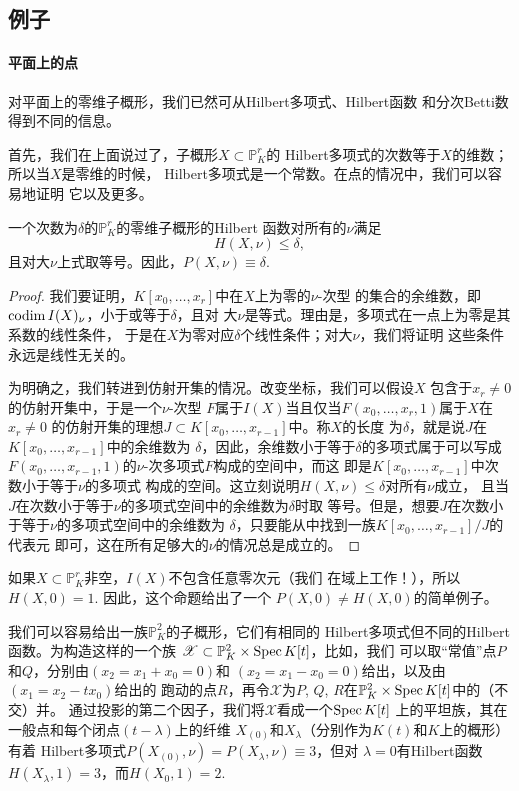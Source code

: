 \subsection{例子}\label{s:3.3.4}
\paragraph*{平面上的点}
对平面上的零维子概形，我们已然可从Hilbert多项式、Hilbert函数
和分次Betti数得到不同的信息。

首先，我们在上面说过了，子概形$X\subset \mathbb P_K^r$的
Hilbert多项式的次数等于$X$的维数；所以当$X$是零维的时候，
Hilbert多项式是一个常数。在点的情况中，我们可以容易地证明
它以及更多。

\begin{pro}\label{pro:3.59}
  一个次数为$\delta$的$\mathbb P_K^r$的零维子概形的Hilbert
  函数对所有的$\nu$满足
  \[H(X,\nu)\leq \delta,\]
  且对大$\nu$上式取等号。因此，$P(X,\nu)\equiv \delta$.
\end{pro}

\begin{proof}
我们要证明，$K[x_0,\dots,x_r]$中在$X$上为零的$\nu$-次型
的集合的余维数，即$\operatorname{codim} I(X)_\nu$，小于或等于$\delta$，且对
大$\nu$是等式。理由是，多项式在一点上为零是其系数的线性条件，
于是在$X$为零对应$\delta$个线性条件；对大$\nu$，我们将证明
这些条件永远是线性无关的。

为明确之，我们转进到仿射开集的情况。改变坐标，我们可以假设$X$
包含于$x_r\neq 0$的仿射开集中，于是一个$\nu$-次型
$F$属于$I(X)$当且仅当$F(x_0,\dots,x_r,1)$属于$X$在$x_r\neq 0$
的仿射开集的理想$J\subset K[x_0,\dots,x_{r-1}]$中。称$X$的长度
为$\delta$，就是说$J$在$K[x_0,\dots,x_{r-1}]$中的余维数为
$\delta$，因此，余维数小于等于$\delta$的多项式属于可以写成
$F(x_0,\dots,x_{r-1},1)$的$\nu$-次多项式$F$构成的空间中，而这
即是$K[x_0,\dots,x_{r-1}]$中次数小于等于$\nu$的多项式
构成的空间。这立刻说明$H(X,\nu)\leq \delta$对所有$\nu$成立，
且当$J$在次数小于等于$\nu$的多项式空间中的余维数为$\delta$时取
等号。但是，想要$J$在次数小于等于$\nu$的多项式空间中的余维数为
$\delta$，只要能从中找到一族$K[x_0,\dots,x_{r-1}]/J$的代表元
即可，这在所有足够大的$\nu$的情况总是成立的。
\end{proof}

如果$X\subset \mathbb P_K^r$非空，$I(X)$不包含任意零次元（我们
在域上工作！），所以$H(X,0)=1$. 因此，这个命题给出了一个
$P(X,0)\neq H(X,0)$的简单例子。

我们可以容易给出一族$\mathbb P_K^2$的子概形，它们有相同的
Hilbert多项式但不同的Hilbert函数。为构造这样的一个族
$\mathscr X\subset \mathbb P_K^2\times \operatorname{Spec} K[t]$，比如，我们
可以取“常值”点$P$和$Q$，分别由$(x_2=x_1+x_0=0)$和
$(x_2=x_1-x_0=0)$给出，以及由$(x_1=x_2-tx_0)$给出的
跑动的点$R$，再令$\mathscr X$为$P$, $Q$, $R$在$\mathbb P_K^2
\times \operatorname{Spec} K[t]$中的（不交）并。
% 
通过投影的第二个因子，我们将$\mathscr X$看成一个$\operatorname{Spec} K[t]$
上的平坦族，其在一般点和每个闭点$(t-\lambda)$上的纤维
$X_{(0)}$和$X_\lambda$（分别作为$K(t)$和$K$上的概形）有着
Hilbert多项式$P(X_{(0)},\nu)=P(X_\lambda,\nu)\equiv 3$，但对
$\lambda =0$有Hilbert函数$H(X_{\lambda},1)=3$，而$H(X_0,1)=2$.

